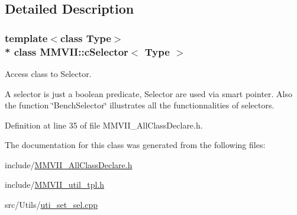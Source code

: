 \subsection{Detailed Description}
\subsubsection*{template$<$class Type$>$\\*
class M\+M\+V\+I\+I\+::c\+Selector$<$ Type $>$}

Access class to Selector. 

A selector is just a boolean predicate, Selector are used via smart pointer. Also the function \char`\"{}\+Bench\+Selector\char`\"{} illustrates all the functionnalities of selectors. 

Definition at line 35 of file M\+M\+V\+I\+I\+\_\+\+All\+Class\+Declare.\+h.



The documentation for this class was generated from the following files\+:\begin{DoxyCompactItemize}
\item 
include/\hyperlink{MMVII__AllClassDeclare_8h}{M\+M\+V\+I\+I\+\_\+\+All\+Class\+Declare.\+h}\item 
include/\hyperlink{MMVII__util__tpl_8h}{M\+M\+V\+I\+I\+\_\+util\+\_\+tpl.\+h}\item 
src/\+Utils/\hyperlink{uti__set__sel_8cpp}{uti\+\_\+set\+\_\+sel.\+cpp}\end{DoxyCompactItemize}
